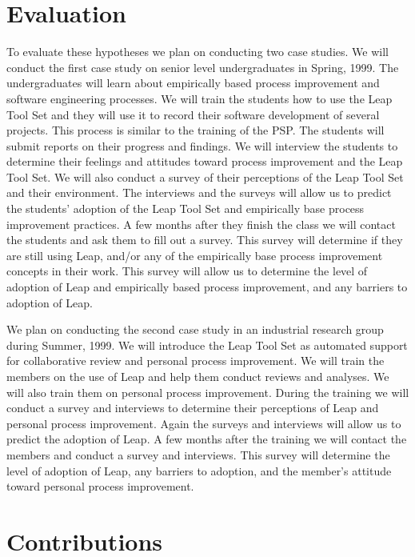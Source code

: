 \documentclass[12pt]{article}
\begin{document}
\section*{Evaluation}

To evaluate these hypotheses we plan on conducting two case studies.  We
will conduct the first case study on senior level undergraduates in Spring,
1999.  The undergraduates will learn about empirically based process
improvement and software engineering processes.  We will train the students
how to use the Leap Tool Set and they will use it to record their software
development of several projects.  This process is similar to the training
of the PSP.  The students will submit reports on their progress and
findings.  We will interview the students to determine their feelings and
attitudes toward process improvement and the Leap Tool Set.  We will also
conduct a survey of their perceptions of the Leap Tool Set and their
environment.  The interviews and the surveys will allow us to predict the
students' adoption of the Leap Tool Set and empirically base process
improvement practices.  A few months after they finish the class we will
contact the students and ask them to fill out a survey.  This survey will
determine if they are still using Leap, and/or any of the empirically base
process improvement concepts in their work.  This survey will allow us to
determine the level of adoption of Leap and empirically based process
improvement, and any barriers to adoption of Leap.

We plan on conducting the second case study in an industrial research group
during Summer, 1999.  We will introduce the Leap Tool Set as automated
support for collaborative review and personal process improvement.  We will
train the members on the use of Leap and help them conduct reviews and
analyses.  We will also train them on personal process improvement.  During
the training we will conduct a survey and interviews to determine their
perceptions of Leap and personal process improvement.  Again the surveys
and interviews will allow us to predict the adoption of Leap.  A few months
after the training we will contact the members and conduct a survey and
interviews.  This survey will determine the level of adoption of Leap, any
barriers to adoption, and the member's attitude toward personal process
improvement.


\section*{Contributions}
\end{document}
